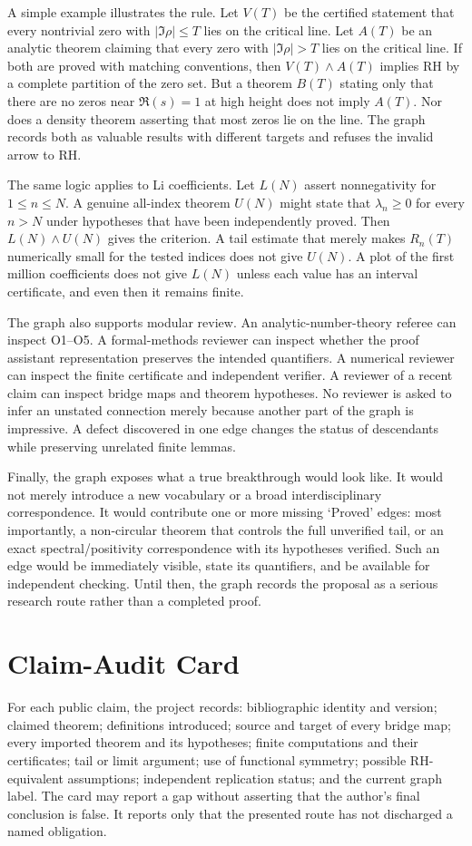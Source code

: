 \documentclass[conference]{../../../../Conference-LaTeX-template_10-17-19/IEEEtran}
\begin{document}
A simple example illustrates the rule. Let $V(T)$ be the certified statement that every nontrivial zero with $|\Im\rho|\le T$ lies on the critical line. Let $A(T)$ be an analytic theorem claiming that every zero with $|\Im\rho|>T$ lies on the critical line. If both are proved with matching conventions, then $V(T)\wedge A(T)$ implies RH by a complete partition of the zero set. But a theorem $B(T)$ stating only that there are no zeros near $\Re(s)=1$ at high height does not imply $A(T)$. Nor does a density theorem asserting that most zeros lie on the line. The graph records both as valuable results with different targets and refuses the invalid arrow to RH.

The same logic applies to Li coefficients. Let $L(N)$ assert nonnegativity for $1\le n\le N$. A genuine all-index theorem $U(N)$ might state that $\lambda_n\ge0$ for every $n>N$ under hypotheses that have been independently proved. Then $L(N)\wedge U(N)$ gives the criterion. A tail estimate that merely makes $R_n(T)$ numerically small for the tested indices does not give $U(N)$. A plot of the first million coefficients does not give $L(N)$ unless each value has an interval certificate, and even then it remains finite.

The graph also supports modular review. An analytic-number-theory referee can inspect O1--O5. A formal-methods reviewer can inspect whether the proof assistant representation preserves the intended quantifiers. A numerical reviewer can inspect the finite certificate and independent verifier. A reviewer of a recent claim can inspect bridge maps and theorem hypotheses. No reviewer is asked to infer an unstated connection merely because another part of the graph is impressive. A defect discovered in one edge changes the status of descendants while preserving unrelated finite lemmas.

Finally, the graph exposes what a true breakthrough would look like. It would not merely introduce a new vocabulary or a broad interdisciplinary correspondence. It would contribute one or more missing `Proved' edges: most importantly, a non-circular theorem that controls the full unverified tail, or an exact spectral/positivity correspondence with its hypotheses verified. Such an edge would be immediately visible, state its quantifiers, and be available for independent checking. Until then, the graph records the proposal as a serious research route rather than a completed proof.
\section{Claim-Audit Card}
For each public claim, the project records: bibliographic identity and version; claimed theorem; definitions introduced; source and target of every bridge map; every imported theorem and its hypotheses; finite computations and their certificates; tail or limit argument; use of functional symmetry; possible RH-equivalent assumptions; independent replication status; and the current graph label. The card may report a gap without asserting that the author's final conclusion is false. It reports only that the presented route has not discharged a named obligation.
\end{document}
